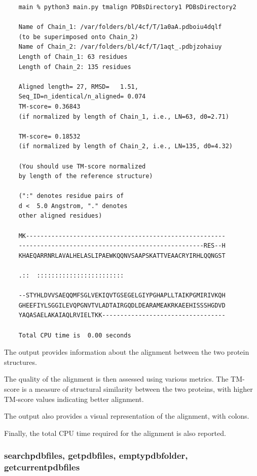\documentclass[]{final_report}
\begin{document}
\begin{lstlisting}
    main % python3 main.py tmalign PDBsDirectory1 PDBsDirectory2

    Name of Chain_1: /var/folders/bl/4cf/T/1a0aA.pdboiu4dqlf
    (to be superimposed onto Chain_2)
    Name of Chain_2: /var/folders/bl/4cf/T/1aqt_.pdbjzohaiuy
    Length of Chain_1: 63 residues
    Length of Chain_2: 135 residues

    Aligned length= 27, RMSD=   1.51, 
    Seq_ID=n_identical/n_aligned= 0.074
    TM-score= 0.36843 
    (if normalized by length of Chain_1, i.e., LN=63, d0=2.71)

    TM-score= 0.18532 
    (if normalized by length of Chain_2, i.e., LN=135, d0=4.32)

    (You should use TM-score normalized 
    by length of the reference structure)

    (":" denotes residue pairs of 
    d <  5.0 Angstrom, "." denotes 
    other aligned residues)

    MK-------------------------------------------------------
    ---------------------------------------------------RES--H
    KHAEQARRNRLAVALHELASLIPAEWKQQNVSAAPSKATTVEAACRYIRHLQQNGST
                                                            
    .::  ::::::::::::::::::::::::                                 

    --STYHLDVVSAEQQMFSGLVEKIQVTGSEGELGIYPGHAPLLTAIKPGMIRIVKQH
    GHEEFIYLSGGILEVQPGNVTVLADTAIRGQDLDEARAMEAKRKAEEHISSSHGDVD
    YAQASAELAKAIAQLRVIELTKK----------------------------------

    Total CPU time is  0.00 seconds
\end{lstlisting}

The output provides information about the alignment between the two protein structures.

The quality of the alignment is then assessed using various metrics. The TM-score is a measure of structural similarity between the two proteins, with higher TM-score values indicating better alignment.

The output also provides a visual representation of the alignment, with colons.

Finally, the total CPU time required for the alignment is also reported.

\clearpage

\subsubsection{searchpdbfiles, getpdbfiles, emptypdbfolder, getcurrentpdbfiles}
\end{document}
